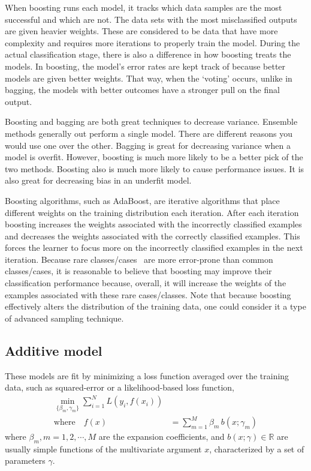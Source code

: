 \documentclass{article}
\begin{document}
When boosting runs each model, it tracks which data samples are the most successful and which are not. The data sets with the most misclassified outputs are given heavier weights. These are considered to be data that have more complexity and requires more iterations to properly train the model.
During the actual classification stage, there is also a difference in how boosting treats the models. In boosting, the model's error rates are kept track of because better models are given better weights.
That way, when the `voting' occurs, unlike in bagging, the models with better outcomes have a stronger pull on the final output.

Boosting and bagging are both great techniques to decrease variance. Ensemble methods generally out perform a single model. There are different reasons you would use one over the other. Bagging is great for decreasing variance when a model is overfit. However, boosting is much more likely to be a better pick of the two methods. Boosting also is much more likely to cause performance issues. It is also great for decreasing bias in an underfit model. 


Boosting algorithms, such as AdaBoost, are iterative algorithms that place different weights on the training distribution each iteration. After each iteration boosting increases the weights associated with the incorrectly classified examples and decreases the weights associated with the correctly classified examples. This forces the learner to focus more on the incorrectly classified examples in the next iteration. Because rare classes/cases~\cite{DBLP:journals/sigkdd/Weiss04} are more error-prone than common classes/cases, it is reasonable to believe that boosting may improve their classification performance because, overall, it will increase the weights of the examples associated with these rare cases/classes. Note that because boosting effectively alters the distribution of the training data, one could consider it a type of advanced sampling technique.

\subsection{Additive model}
These models are fit by minimizing a loss function averaged over the training data, such as squared-error or a likelihood-based loss function,
\begin{align*}
\min_{\{\beta_m,\gamma_m\}} \sum_{i=1}^{N} L(y_i, f(x_i)) & \\
\mbox{where} \quad f(x) &= \sum_{m=1}^{M} \beta_m \, b(x;\gamma_m)
\end{align*}
where $\beta_m, m=1,2,\cdots,M$ are the expansion coefficients, and $b(x;\gamma) \in \mathbb{R}$ are usually simple functions of the multivariate argument $x$, characterized  by a set of parameters $\gamma$.  
\end{document}
